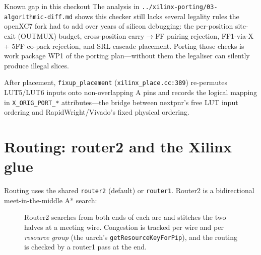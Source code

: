 \documentclass[11pt,a4paper]{article}
\begin{document}
\begin{warnbox}{Known gap in this checkout}
The analysis in \texttt{../xilinx-porting/03-algorithmic-diff.md} shows
this checker still lacks several legality rules the openXC7 fork had to
add over years of silicon debugging: the per-position site-exit
(OUTMUX) budget, cross-position carry$\to$FF pairing rejection,
FF1-via-X + 5FF co-pack rejection, and SRL cascade placement. Porting
those checks is work package WP1 of the porting plan---without them the
legaliser can silently produce illegal slices.
\end{warnbox}

After placement, \texttt{fixup\_placement}
(\texttt{xilinx\_place.cc:389}) re-permutes LUT5/LUT6 inputs onto
non-overlapping A pins and records the logical mapping in
\texttt{X\_ORIG\_PORT\_*} attributes---the bridge between nextpnr's
free LUT input ordering and RapidWright/Vivado's fixed physical
ordering.

\section{Routing: router2 and the Xilinx glue}

Routing uses the shared \texttt{router2} (default) or \texttt{router1}.
Router2 is a bidirectional meet-in-the-middle A* search:

\begin{figure}[htbp]
\centering
{}
\caption{Router2 searches from both ends of each arc and stitches the
two halves at a meeting wire. Congestion is tracked per wire and per
\emph{resource group} (the uarch's \texttt{getResourceKeyForPip}), and
the routing is checked by a router1 pass at the end.}
\label{fig:router2}
\end{figure}
\end{document}
